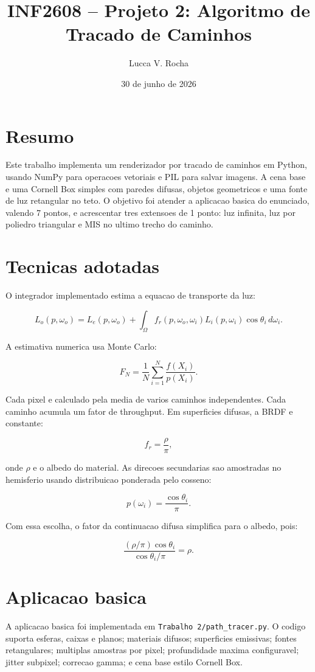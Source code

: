 \documentclass[11pt,a4paper]{article}
\title{INF2608 -- Projeto 2: Algoritmo de Tracado de Caminhos}
\author{Lucca V. Rocha}
\date{30 de junho de 2026}
\begin{document}
\maketitle

\section{Resumo}

Este trabalho implementa um renderizador por tracado de caminhos em Python, usando NumPy para operacoes vetoriais e PIL para salvar imagens. A cena base e uma Cornell Box simples com paredes difusas, objetos geometricos e uma fonte de luz retangular no teto. O objetivo foi atender a aplicacao basica do enunciado, valendo 7 pontos, e acrescentar tres extensoes de 1 ponto: luz infinita, luz por poliedro triangular e MIS no ultimo trecho do caminho.

\section{Tecnicas adotadas}

O integrador implementado estima a equacao de transporte da luz:

\[
L_o(p,\omega_o) = L_e(p,\omega_o) +
\int_\Omega f_r(p,\omega_o,\omega_i)L_i(p,\omega_i)\cos\theta_i\,d\omega_i.
\]

A estimativa numerica usa Monte Carlo:

\[
F_N = \frac{1}{N}\sum_{i=1}^{N}\frac{f(X_i)}{p(X_i)}.
\]

Cada pixel e calculado pela media de varios caminhos independentes. Cada caminho acumula um fator de throughput. Em superficies difusas, a BRDF e constante:

\[
f_r = \frac{\rho}{\pi},
\]

onde $\rho$ e o albedo do material. As direcoes secundarias sao amostradas no hemisferio usando distribuicao ponderada pelo cosseno:

\[
p(\omega_i) = \frac{\cos\theta_i}{\pi}.
\]

Com essa escolha, o fator da continuacao difusa simplifica para o albedo, pois:

\[
\frac{(\rho/\pi)\cos\theta_i}{\cos\theta_i/\pi} = \rho.
\]

\section{Aplicacao basica}

A aplicacao basica foi implementada em \texttt{Trabalho 2/path\_tracer.py}. O codigo suporta esferas, caixas e planos; materiais difusos; superficies emissivas; fontes retangulares; multiplas amostras por pixel; profundidade maxima configuravel; jitter subpixel; correcao gamma; e cena base estilo Cornell Box.
\end{document}
